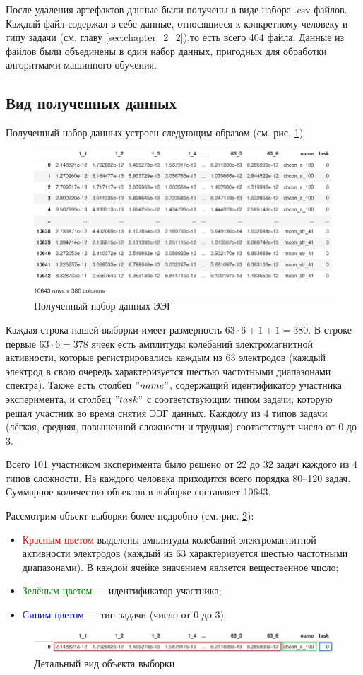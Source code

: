 После удаления артефактов данные были получены в виде набора .csv файлов. Каждый файл содержал
в себе данные, относящиеся к конкретному человеку и типу задачи (см. главу
\ref{sec:chapter_2_2}),то есть всего 404 файла. Данные из файлов были объединены
в один набор данных, пригодных для обработки алгоритмами машинного обучения.

\subsection{Вид полученных данных}
\label{sec:chapter_3_3}

Полученный набор данных устроен следующим образом (см. рис. \ref{fig_3})\\
\begin{figure}[H]
    \centering
    \includegraphics[width=\linewidth]{images/3.png}
    \caption{Полученный набор данных ЭЭГ}
    \label{fig_3}
\end{figure}

Каждая строка нашей выборки имеет размерность $63\cdot 6+1+1=380$. В строке первые $63\cdot 6=378$
ячеек есть амплитуды колебаний электромагнитной активности, которые регистрировались
каждым из 63 электродов (каждый электрод в свою очередь характеризуется шестью частотными
диапазонами спектра). Также есть столбец $"name"$, содержащий идентификатор участника
эксперимента, и столбец $"task"$ с соответствующим типом задачи, которую решал участник во
время снятия ЭЭГ данных. Каждому из 4 типов задачи (лёгкая, средняя, повышенной сложности
и трудная) соответствует число от 0 до 3.

Всего 101 участником эксперимента было решено от 22 до 32 задач каждого из 4 типов сложности.
На каждого человека приходится всего порядка 80--120 задач.
Суммарное количество объектов в выборке составляет 10643.

Рассмотрим объект выборки более подробно (см. рис. \ref{fig_4}):
\begin{itemize}
    \item \textcolor{red}{Красным цветом} выделены амплитуды колебаний электромагнитной
    активности электродов (каждый из 63 характеризуется шестью частотными диапазонами).
    В каждой ячейке значением является вещественное число;
    \item \textcolor{green}{Зелёным цветом} --- идентификатор участника; 
    \item \textcolor{blue}{Синим цветом} --- тип задачи (число от 0 до 3).
\end{itemize}


\begin{figure}[H]
    \centering
    \includegraphics[width=\linewidth]{images/4.png}
    \caption{Детальный вид объекта выборки}
    \label{fig_4}
\end{figure}
